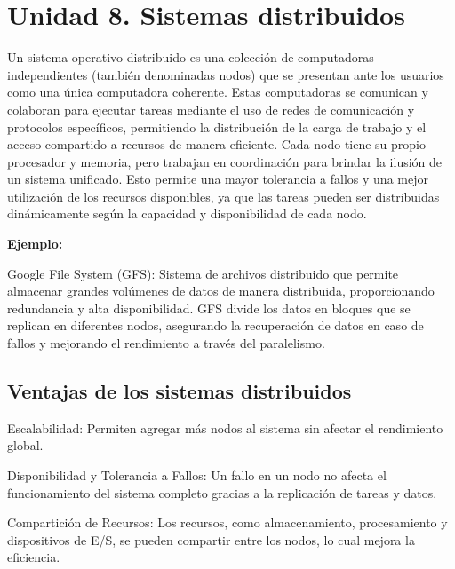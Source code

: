 \chapter{Unidad 8. Sistemas  distribuidos}
Un sistema operativo distribuido es una colección de computadoras independientes (también denominadas nodos) que se presentan ante los usuarios como una única computadora coherente. Estas computadoras se comunican y colaboran para ejecutar tareas mediante el uso de redes de comunicación y protocolos específicos, permitiendo la distribución de la carga de trabajo y el acceso compartido a recursos de manera eficiente. Cada nodo tiene su propio procesador y memoria, pero trabajan en coordinación para brindar la ilusión de un sistema unificado. Esto permite una mayor tolerancia a fallos y una mejor utilización de los recursos disponibles, ya que las tareas pueden ser distribuidas dinámicamente según la capacidad y disponibilidad de cada nodo.

\textbf{Ejemplo:}

Google File System (GFS): Sistema de archivos distribuido que permite almacenar grandes volúmenes de datos de manera distribuida, proporcionando redundancia y alta disponibilidad. GFS divide los datos en bloques que se replican en diferentes nodos, asegurando la recuperación de datos en caso de fallos y mejorando el rendimiento a través del paralelismo.

\section{Ventajas de los sistemas distribuidos}
Escalabilidad: Permiten agregar más nodos al sistema sin afectar el rendimiento global.

Disponibilidad y Tolerancia a Fallos: Un fallo en un nodo no afecta el funcionamiento del sistema completo gracias a la replicación de tareas y datos.

Compartición de Recursos: Los recursos, como almacenamiento, procesamiento y dispositivos de E/S, se pueden compartir entre los nodos, lo cual mejora la eficiencia.


